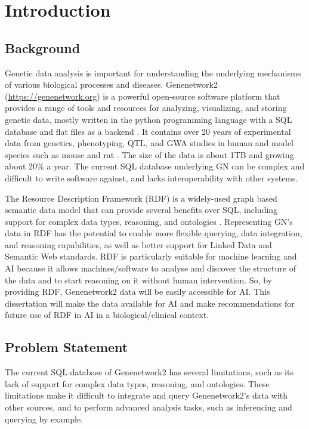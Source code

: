 \chapter{Introduction}

\section{Background}
Genetic data analysis is important for understanding the underlying mechanisms of various biological processes and diseases.  Genenetwork2 (\url{https://genenetwork.org}) is a powerful open-source software platform that provides a range of tools and resources for analyzing, visualizing, and storing genetic data, mostly written in the python programming language with a SQL database and flat files as a backend \citep{sloan2016genenetwork,mulligan2017genenetwork}.  It contains over 20 years of experimental data from genetics, phenotyping, QTL, and GWA studies in human and model species such as mouse and rat \citep{sloan2016genenetwork}.  The size of the data is about 1TB and growing about 20\% a year. The current SQL database underlying GN can be complex and difficult to write software against, and lacks interoperability with other systems.

The Resource Description Framework (RDF) is a widely-used graph based semantic data model that can provide several benefits over SQL, including support for complex data types, reasoning, and ontologies \citep{candan2001resource,allemang2011semantic}.  Representing GN's data in RDF has the potential to enable more flexible querying, data integration, and reasoning capabilities, as well as better support for Linked Data and Semantic Web standards. RDF is particularly suitable for machine learning and AI because it allows machines/software to analyse and discover the structure of the data and to start reasoning on it without human intervention. So, by providing RDF, Genenetwork2 data will be easily accessible for AI. This dissertation will make the data available for AI and make recommendations for future use of RDF in AI in a biological/clinical context.

\clearpage
\section{Problem Statement}

The current SQL database of Genenetwork2 has several limitations, such as its lack of support for complex data types, reasoning, and ontologies.  These limitations make it difficult to integrate and query Genenetwork2's data with other sources, and to perform advanced analysis tasks, such as inferencing and querying by example.

